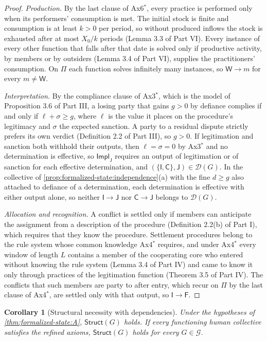 \documentclass[11pt,letterpaper]{article}
\newtheorem{corollary}[theorem]{Corollary}
\theoremstyle{definition}
\theoremstyle{remark}
\newcommand{\pF}{\mathsf{F}}
\newcommand{\pJ}{\mathsf{J}}
\newcommand{\pI}{\mathsf{I}}
\newcommand{\pC}{\mathsf{C}}
\newcommand{\pW}{\mathsf{W}}
\newcommand{\Struct}{\mathsf{Struct}}
\newcommand{\Impl}{\mathsf{Impl}}
\begin{document}
\begin{proof}
\emph{Production.} By the last clause of Ax6$^{*}$, every practice is performed only when its performers' consumption is met. The initial stock is finite and consumption is at least $k>0$ per period, so without produced inflows the stock is exhausted after at most $X_0/k$ periods (Lemma 3.3 of Part VI). Every instance of every other function that falls after that date is solved only if productive activity, by members or by outsiders (Lemma 3.4 of Part VI), supplies the practitioners' consumption. On $\Pi$ each function solves infinitely many instances, so $\pW\to m$ for every $m\neq\pW$.

\emph{Interpretation.} By the compliance clause of Ax3$^{*}$, which is the model of Proposition 3.6 of Part III, a losing party that gains $g>0$ by defiance complies if and only if $\ell+\sigma\ge g$, where $\ell$ is the value it places on the procedure's legitimacy and $\sigma$ the expected sanction. A party to a residual dispute strictly prefers its own verdict (Definition 2.2 of Part III), so $g>0$. If legitimation and sanction both withhold their outputs, then $\ell=\sigma=0$ by Ax3$^{*}$ and no determination is effective, so $\Impl_{\pJ}$ requires an output of legitimation or of sanction for each effective determination, and $(\{\pI,\pC\},\pJ)\in\mathcal{D}(G)$. In the collective of \cref{prop:formalized-state:independence}(a) with the fine $d\ge g$ also attached to defiance of a determination, each determination is effective with either output alone, so neither $\pI\to\pJ$ nor $\pC\to\pJ$ belongs to $\mathcal{D}(G)$.

\emph{Allocation and recognition.} A conflict is settled only if members can anticipate the assignment from a description of the procedure (Definition 2.2(b) of Part I), which requires that they know the procedure. Settlement procedures belong to the rule system whose common knowledge Ax4$^{*}$ requires, and under Ax4$^{*}$ every window of length $L$ contains a member of the cooperating core who entered without knowing the rule system (Lemma 3.4 of Part IV) and came to know it only through practices of the legitimation function (Theorem 3.5 of Part IV). The conflicts that such members are party to after entry, which recur on $\Pi$ by the last clause of Ax4$^{*}$, are settled only with that output, so $\pI\to\pF$.
\end{proof}

\begin{corollary}[Structural necessity with dependencies]
\label{cor:formalized-state:struct}
Under the hypotheses of \cref{thm:formalized-state:A}, $\Struct(G)$ holds. If every functioning human collective satisfies the refined axioms, $\Struct(G)$ holds for every $G\in\mathcal{G}$.
\end{corollary}
\end{document}
